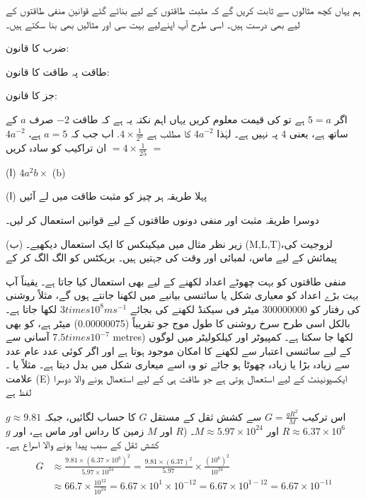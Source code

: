  ہم یہاں کچھ مثالوں سے ثابت کریں گے کہ مثبت طاقتوں کے لیے بنائے گئے قوانین منفی طاقتوں کے لیے بھی درست ہیں۔ اسی طرح آپ اپنےلیے بہت سی اور مثالیں بھی بنا سکتے ہیں۔

ضرب کا قانون:

طاقت پہ طاقت کا قانون:

جز کا قانون:

اگر  $ 5= a$ ہے تو  کی قیمت معلوم کریں
یہاں اہم نکتہ یہ ہے کہ طاقت 
$-2$
صرف
$a$
کے ساتھ ہے، یعنی $4$ پہ نہیں ہے۔ لہٰذا  
$4a^{-2}$
کا مطلب ہے
\(4\times{\frac{1}{2^{a}}}\). اب جب کہ \(a=5\) ہے،  \(4a^{-2}\) \(=\) \(=4\times{\frac{1}{25}}\)
ان تراکیب کو سادہ کریں

(ا) 
\(4a^{2}b\times\)
(b)

(ا) پہلا طریقہ ہر چیز کو مثبت طاقت میں لے آئیں

دوسرا طریقہ
مثبت اور منفی دونوں طاقتوں کے لیے قوانین استعمال کر لیں۔


(ب) زیر نظر مثال میں میکینکس کا ایک استعمال دیکھیے۔ (M,L,T)،لزوجیت کی پیمائش کے لیے ماس، لمبائی اور وقت کی جہتیں ہیں۔ بریکٹس کو الگ الگ کر کے


منفی طاقتوں کو بہت چھوٹے اعداد لکھنے کے لیے بھی استعمال کیا جاتا ہے۔ یقیناً آپ بہت بڑے اعداد کو معیاری شکل یا سائنسی بیانیے میں لکھنا جانتے ہوں گے، مثلاً روشنی کی رفتار کو  300000000 میٹر فی سیکنڈ لکھنے کی بجائے
\(3times10^{8}ms^{-1}\)
 لکھا جاتا ہے۔ بالکل اسی طرح سرخ روشنی کا طول موج جو تقریباً 
(0.00000075) میٹر ہے، کو بھی آسانی سے 
\(7.5 times 10^{-7}\) metres) لکھا جا سکتا ہے۔
کمپیوٹر اور کیلکولیٹر میں لوگوں کے لیے سائنسی اعتبار سے لکھنے کا امکان موجود ہوتا ہے اور اگر کوئی عدد عام عدد سے زیادہ بڑا یا زیادہ چھوٹا ہو جائے تو وہ اسے میعاری شکل میں بدل دیتا ہے۔ مثلاً  یا ۔ علامت
(E) ایکسپونینٹ کے لیے استعمال ہوتی ہے جو طاقت ہی کے لیے استعمال ہونے والا دوسرا لفظ ہے

اس ترکیب \(G=\frac{gR^{2}}{M}\) سے کشش ثقل کے مستقل \(G\) کا حساب لگائیں، جبکہ \(g\approx 9.81\)
\(R\approx 6.37\times 10^{6}\) اور
\(M\approx 5.97\times 10^{24}\)۔ 
(\(R\) اور \(M\) زمین کا رداس اور ماس ہے، اور 
\( g \) کشش ثقل کے سبب پیدا ہونے والا اسراع ہے۔
\begin{align*}
G&\approx \frac{9.81\times (6.37\times 10^{6})^{2}}{5.97\times 10^{24}}=\frac{9.81\times(6.37)^{2}}{5.97}\times \frac{(10^{6})^{2}}{10^{24}}\\
&\approx 66.7\times\frac{10^{12}}{10^{24}}=6.67\times 10^{1}\times 10^{-12}=6.67\times 10^{1-12}=6.67\times 10^{-11}\\
\end{align*}

